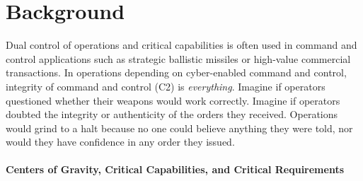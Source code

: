 \documentclass[10pt,twoside]{article}
\begin{document}
\section{Background}
\label{sec:background}

Dual control of operations and critical capabilities is often used in
command and control applications such as strategic ballistic missiles
or high-value commercial transactions. In operations depending on
cyber-enabled command and control, integrity of command and control
(C2) is \emph{everything}.  Imagine if operators questioned whether
their weapons would work correctly. Imagine if operators doubted the
integrity or authenticity of the orders they received. Operations
would grind to a halt because no one could believe anything they were
told, nor would they have confidence in any order they issued.

\paragraph{Centers of Gravity, Critical Capabilities, and Critical
  Requirements}
\end{document}
